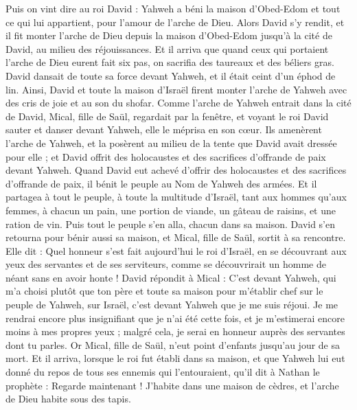 \begin{multicols}{2}
Puis on vint dire au roi David : Yahweh a béni la maison d'Obed-Edom et tout ce qui lui appartient, pour l’amour de l'arche de Dieu. Alors David s'y rendit, et il fit monter l'arche de Dieu depuis la maison d'Obed-Edom jusqu’à la cité de David, au milieu des réjouissances.
Et il arriva que quand ceux qui portaient l'arche de Dieu eurent fait six pas, on sacrifia des taureaux et des béliers gras.
David dansait de toute sa force devant Yahweh, et il était ceint d'un éphod de lin.
Ainsi, David et toute la maison d'Israël firent monter l'arche de Yahweh avec des cris de joie et au son du shofar.
Comme l'arche de Yahweh entrait dans la cité de David, Mical, fille de Saül, regardait par la fenêtre, et voyant le roi David sauter et danser devant Yahweh, elle le méprisa en son cœur.
Ils amenèrent l'arche de Yahweh, et la posèrent au milieu de la tente que David avait dressée pour elle ; et David offrit des holocaustes et des sacrifices d’offrande de paix devant Yahweh.
Quand David eut achevé d'offrir des holocaustes et des sacrifices d'offrande de paix, il bénit le peuple au Nom de Yahweh des armées.
Et il partagea à tout le peuple, à toute la multitude d'Israël, tant aux hommes qu'aux femmes, à chacun un pain, une portion de viande, un gâteau de raisins, et une ration de vin. Puis tout le peuple s'en alla, chacun dans sa maison.
David s'en retourna pour bénir aussi sa maison, et Mical, fille de Saül, sortit à sa rencontre. Elle dit : Quel honneur s'est fait aujourd'hui le roi d'Israël, en se découvrant aux yeux des servantes et de ses serviteurs, comme se découvrirait un homme de néant sans en avoir honte !
David répondit à Mical : C’est devant Yahweh, qui m'a choisi plutôt que ton père et toute sa maison pour m’établir chef sur le peuple de Yahweh, sur Israël, c'est devant Yahweh que je me suis réjoui.
Je me rendrai encore plus insignifiant que je n’ai été cette fois, et je m’estimerai encore moins à mes propres yeux ; malgré cela, je serai en honneur auprès des servantes dont tu parles.
Or Mical, fille de Saül, n'eut point d’enfants jusqu'au jour de sa mort.
\VerseOne{}Et il arriva, lorsque le roi fut établi dans sa maison, et que Yahweh lui eut donné du repos de tous ses ennemis qui l’entouraient,
qu’il dit à Nathan le prophète : Regarde maintenant ! J'habite dans une maison de cèdres, et l'arche de Dieu habite sous des tapis.

\end{multicols}
